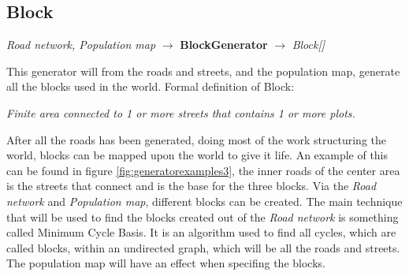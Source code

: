 \subsection{Block}
\begin{center}
    \textit{Road network, Population map} $\rightarrow$ \textbf{BlockGenerator} $\rightarrow$ \textit{Block{[}{]}}
\end{center}
This generator will from the roads and streets, and the population map, generate all the blocks used in the world.
Formal definition of Block:
\begin{center}
    \textit{Finite area connected to 1 or more streets that contains 1 or more plots.}
\end{center}
After all the roads has been generated, doing most of the work structuring the world, blocks can be mapped upon the world to give it life.
An example of this can be found in figure \ref{fig:generatorexamples3}, the inner roads of the center area is the streets that connect and is the base for the three blocks.
Via the \textit{Road network} and \textit{Population map}, different blocks can be created. 
The main technique that will be used to find the blocks created out of the \textit{Road network} is something called Minimum Cycle Basis.
It is an algorithm used to find all cycles, which are called blocks, within an undirected graph, which will be all the roads and streets. 
The population map will have an effect when specifing the blocks. 